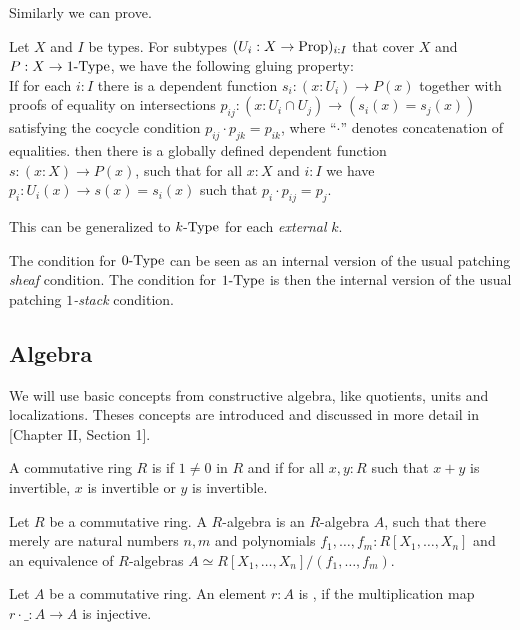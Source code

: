 Similarly we can prove.

\begin{lemma}%
  \label{kraus-glueing-1-type}
  Let $X$ and $I$ be types.
  For subtypes $(U_i:X \to \mathrm{Prop})_{i:I}$ that cover $X$ 
  and $P:X\to 1\mbox{-}\mathrm{Type}$, we have the following gluing property: \\
  If for each $i:I$ there is a dependent function $s_i:(x:U_i)\to P(x)$ together with
  proofs of equality on intersections $p_{ij}:(x:U_i\cap U_j)\to (s_i(x)=s_j(x))$ satisfying the cocycle
  condition $p_{ij}\cdot p_{jk} = p_{ik}$, where ``$\cdot$'' denotes concatenation of equalities.
  then there is a globally defined dependent function $s:(x:X) \to P(x)$,
  such that for all $x:X$ and $i:I$ we have $p_i:U_i(x) \to s(x)=s_i(x)$ such that $p_i\cdot p_{ij} = p_j$.
\end{lemma}

This can be generalized to $k\mbox{-}\mathrm{Type}$ for each {\em external} $k$.

The condition for $0\mbox{-}\mathrm{Type}$ can be seen as an internal version of the usual patching {\em sheaf} condition.
The condition for $1\mbox{-}\mathrm{Type}$ is then the internal version of the usual patching {\em $1$-stack} condition.

\subsection{Algebra}
We will use basic concepts from constructive algebra, like quotients, units and localizations.
Theses concepts are introduced and discussed in more detail in \cite{lombardi-quitte}[Chapter II, Section 1].

\begin{definition}%
  \label{local-ring}
  A commutative ring $R$ is  if $1\neq 0$ in $R$ and
  if for all $x,y:R$ such that $x+y$ is invertible, $x$ is invertible or $y$ is invertible.
\end{definition}

\begin{definition}%
  \label{def-finitely-presented}
  Let $R$ be a commutative ring.
  A  $R$-algebra is an $R$-algebra $A$,
  such that there merely are natural numbers $n,m$ and polynomials $f_1,\dots,f_m:R[X_1,\dots,X_n]$
  and an equivalence of $R$-algebras $A\simeq R[X_1,\dots,X_n]/(f_1,\dots,f_m)$.
\end{definition}

\begin{definition}%
  \label{regular-element}
  Let $A$ be a commutative ring.
  An element $r:A$ is ,
  if the multiplication map $r\cdot\_:A\to A$ is injective.
\end{definition}

